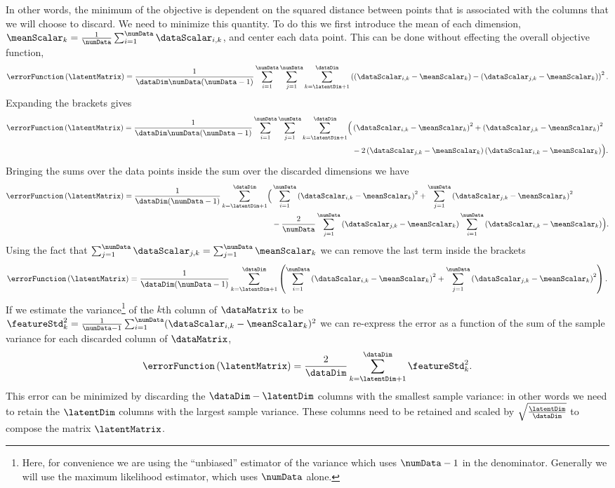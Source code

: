 In other words, the minimum of the objective is dependent on the
squared distance between points that is associated with the columns
that we will choose to discard. We need to minimize this quantity. To
do this we first introduce the mean of each dimension,
$\meanScalar_k=\frac{1}{\numData}\sum_{i=1}^{\numData}\dataScalar_{i,k}$,
and center each data point. This can be done without effecting the
overall objective function,
\[
\errorFunction\left(\latentMatrix\right)
=\frac{1}{\dataDim\numData(\numData-1)}\sum_{i=1}^{\numData}\sum_{j=1}^{\numData}\sum_{k=\latentDim+1}^{\dataDim}\left(\left(\dataScalar_{i,k}-\meanScalar_{k}\right)-\left(\dataScalar_{j,k}-\meanScalar_{k}\right)\right)^{2}.
\]
Expanding the brackets gives
\begin{align*}
\errorFunction\left(\latentMatrix\right)
=\frac{1}{\dataDim\numData(\numData-1)}\sum_{i=1}^{\numData}\sum_{j=1}^{\numData}\sum_{k=\latentDim+1}^{\dataDim}\Bigl(&\left(\dataScalar_{i,k}-\meanScalar_{k}\right)^{2}+\left(\dataScalar_{j,k}-\meanScalar_{k}\right)^{2}\\&-2\left(\dataScalar_{j,k}-\meanScalar_{k}\right)\left(\dataScalar_{i,k}-\meanScalar_{k}\right)\Bigr).
\end{align*}
Bringing the sums over the data points inside the sum over the
discarded dimensions we have
\begin{align*}
\errorFunction\left(\latentMatrix\right)
=\frac{1}{\dataDim(\numData-1)}\sum_{k=\latentDim+1}^{\dataDim}\Bigl(&\sum_{i=1}^{\numData}\left(\dataScalar_{i,k}-\meanScalar_{k}\right)^{2}+\sum_{j=1}^{\numData}\left(\dataScalar_{j,k}-\meanScalar_{k}\right)^{2}\\&-\frac{2}{\numData}\sum_{j=1}^{\numData}\left(\dataScalar_{j,k}-\meanScalar_{k}\right)\sum_{i=1}^{\numData}\left(\dataScalar_{i,k}-\meanScalar_{k}\right)\Bigr).
\end{align*}
Using the fact that $\sum_{j=1}^\numData \dataScalar_{j,k} =
\sum_{j=1}^\numData \meanScalar_k$ we can remove the last term inside
the brackets
\[
\errorFunction\left(\latentMatrix\right)
=\frac{1}{\dataDim(\numData-1)}\sum_{k=\latentDim+1}^{\dataDim}\left(\sum_{i=1}^{\numData}\left(\dataScalar_{i,k}-\meanScalar_{k}\right)^{2}+\sum_{j=1}^{\numData}\left(\dataScalar_{j,k}-\meanScalar_{k}\right)^{2}\right).
\]
If we estimate the variance\footnote{Here, for convenience we are using the ``unbiased'' estimator of the variance which uses $\numData-1$ in the denominator. Generally we will use the maximum likelihood estimator, which uses $\numData$ alone.} of the $k$th column of $\dataMatrix$
to be $\featureStd^2_k=\frac{1}{\numData-1}\sum_{i=1}^\numData
(\dataScalar_{i, k} - \meanScalar_{k})^2$ we can re-express the error
as a function of the sum of the sample variance for each discarded
column of $\dataMatrix$,
\[
\errorFunction\left(\latentMatrix\right)=\frac{2}{\dataDim}\sum_{k=\latentDim+1}^{\dataDim}\featureStd_{k}^{2}.
\]
This error can be minimized by discarding the $\dataDim-\latentDim$
columns with the smallest sample variance: in other words we need to
retain the $\latentDim$ columns with the largest sample
variance. These columns need to be retained and scaled by
$\sqrt{\frac{\latentDim}{\dataDim}}$ to compose the matrix
$\latentMatrix$.

